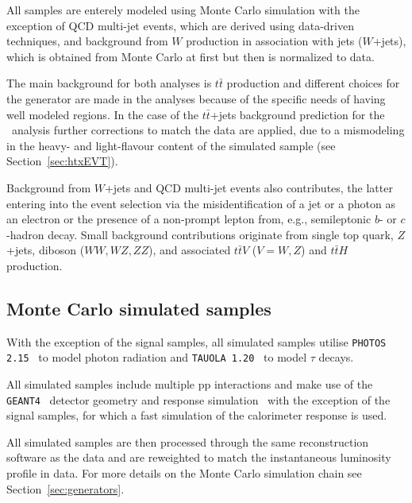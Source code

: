 All samples are enterely modeled using Monte Carlo simulation with the exception
of QCD multi-jet events, which are derived using data-driven techniques, and 
background from $W$ production in association with jets ($W$+jets), which is obtained
from Monte Carlo at first but then is normalized to data.

The main background for both analyses is $t\bar{t}$ 
production %
and different choices for the generator are made
in the analyses because of the specific needs of having well
modeled regions.
In the case of the $t\bar{t}$+jets background prediction for the \htx\ analysis 
further corrections to match the data are applied, due to a mismodeling in the
heavy- and light-flavour content of the simulated sample 
(see Section~\ref{sec:htxEVT}).

Background from $W$+jets 
and QCD multi-jet events also contributes, the latter
entering into the event selection via the misidentification of a jet or a photon as an
electron or the presence of a non-prompt lepton from, e.g., semileptonic $b$- or $c$-hadron decay.
Small background contributions originate from single top quark, $Z$+jets, diboson
($WW,WZ,ZZ$), and associated $t\bar{t}V$ ($V=W,Z$) and $t\bar{t}H$ production.

\subsection{Monte Carlo simulated samples}\label{sec:MCbkg}

With the exception of the 
signal samples, all simulated 
samples utilise {\tt PHOTOS 2.15}~\cite{PhotosPaper} to model
photon radiation and {\tt TAUOLA 1.20}~\cite{TauolaPaper} to model
$\tau$ decays.  

All simulated samples include multiple pp
interactions and make use of the  {\tt GEANT4}~\cite{geant}
detector geometry and response simulation~\cite{atlas_sim}
with the exception of the signal samples, for which a fast simulation of
the calorimeter response is used.

All simulated samples are then processed through the same reconstruction 
software as the data and are reweighted to match 
the instantaneous luminosity profile in data. For more details
on the Monte Carlo simulation chain see Section~\ref{sec:generators}.



